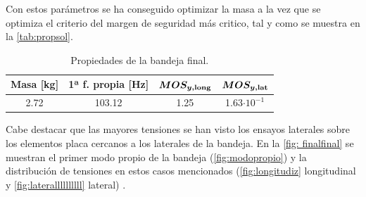 Con estos parámetros se ha conseguido optimizar la masa a la vez que se optimiza el criterio del margen de seguridad más critico, tal y como se muestra en la \autoref{tab:propsol}.

\begin{table}[H]
\centering
\caption{Propiedades de la bandeja final.}
\label{tab:propsol}
\begin{tabular}{cccc} \toprule
\multicolumn{1}{c}{\textbf{Masa} [kg]} & \textbf{1ª f. propia} [Hz] & $\boldsymbol{MOS_{y,\text{\textbf{long}}}}$ & $\boldsymbol{MOS_{y,\text{\textbf{lat}}}}$ \\ \midrule
  2.72   & 103.12   & 1.25  & 1.63$\cdot 10^{-1}$    \\ \bottomrule
\end{tabular}
\end{table}

Cabe destacar que las mayores tensiones se han visto los ensayos laterales sobre los elementos placa cercanos a los laterales de la bandeja. En la \autoref{fig: finalfinal} se muestran el primer modo propio de la bandeja (\autoref{fig:modopropio}) y la distribución de tensiones en estos casos mencionados (\autoref{fig:longitudiz} longitudinal y \autoref{fig:laterallllllllll} lateral) .


